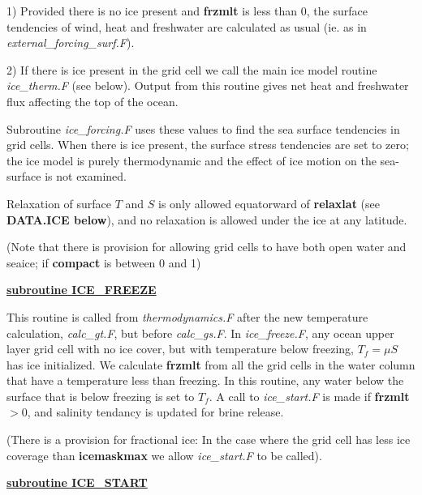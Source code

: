 1) Provided there is no ice present and {\bf frzmlt} is less than 0,
   the surface tendencies of wind, heat and freshwater are calculated
   as usual (ie. as in {\it external\_forcing\_surf.F}).

2) If there is ice present in the grid cell
   we call the main ice model routine {\it ice\_therm.F} (see below).
   Output from this routine gives net heat and freshwater flux 
   affecting the top of the ocean.

Subroutine {\it ice\_forcing.F} uses these values to find the 
sea surface tendencies
in grid cells. When there is ice present,  
the surface stress tendencies are
set to zero; the ice model is purely thermodynamic and the
effect of ice motion on the sea-surface is not examined.

Relaxation of surface $T$ and $S$ is only allowed equatorward
of {\bf relaxlat} (see {\bf DATA.ICE below}), and no relaxation is
allowed under the ice at any latitude.

\noindent
{\tiny (Note that there is provision for allowing grid cells to have both
open water and seaice; if {\bf compact} is between  0 and 1)}

\vspace{1cm}
\noindent
{\bf {\underline{ subroutine ICE\_FREEZE}}}

This routine is called from {\it thermodynamics.F}
after the new temperature calculation, {\it calc\_gt.F}, 
but before {\it calc\_gs.F}.
In {\it ice\_freeze.F}, any ocean upper layer grid cell
with no ice cover, but with temperature below freezing,
$T_f=\mu S$ has ice initialized.
We calculate {\bf frzmlt} from all the grid cells in
the water column that have a temperature less than
freezing. In this routine, any water below the surface
that is below freezing is set to $T_f$.
A call to
{\it ice\_start.F} is made if {\bf frzmlt} $>0$, 
and salinity tendancy is updated for brine release.

\noindent
{\tiny (There is a provision for fractional ice:
In the case where the grid cell has less ice coverage than
{\bf icemaskmax} we allow {\it ice\_start.F} to be called).}


\vspace{1cm}
\noindent
{\bf {\underline{ subroutine ICE\_START}}}

